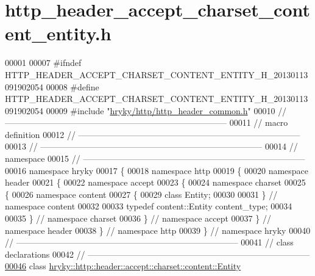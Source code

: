 \hypertarget{http__header__accept__charset__content__entity_8h_source}{\section{http\-\_\-header\-\_\-accept\-\_\-charset\-\_\-content\-\_\-entity.\-h}
}

\begin{DoxyCode}
00001 
00007 \textcolor{preprocessor}{#ifndef HTTP\_HEADER\_ACCEPT\_CHARSET\_CONTENT\_ENTITY\_H\_20130113091902054}
00008 \textcolor{preprocessor}{}\textcolor{preprocessor}{#define HTTP\_HEADER\_ACCEPT\_CHARSET\_CONTENT\_ENTITY\_H\_20130113091902054}
00009 \textcolor{preprocessor}{}\textcolor{preprocessor}{#include "\hyperlink{http__header__common_8h}{hryky/http/http_header_common.h}"}
00010 \textcolor{comment}{//
      ------------------------------------------------------------------------------}
00011 \textcolor{comment}{// macro definition}
00012 \textcolor{comment}{//
      ------------------------------------------------------------------------------}
00013 \textcolor{comment}{//
      ------------------------------------------------------------------------------}
00014 \textcolor{comment}{// namespace}
00015 \textcolor{comment}{//
      ------------------------------------------------------------------------------}
00016 \textcolor{keyword}{namespace }hryky
00017 \{
00018 \textcolor{keyword}{namespace }http
00019 \{
00020 \textcolor{keyword}{namespace }header
00021 \{
00022 \textcolor{keyword}{namespace }accept
00023 \{
00024 \textcolor{keyword}{namespace }charset
00025 \{
00026 \textcolor{keyword}{namespace }content
00027 \{
00029     \textcolor{keyword}{class }Entity;
00030 
00031 \} \textcolor{comment}{// namespace content}
00032 
00033 \textcolor{keyword}{typedef} content::Entity content\_type;
00034 
00035 \} \textcolor{comment}{// namespace charset}
00036 \} \textcolor{comment}{// namespace accept}
00037 \} \textcolor{comment}{// namespace header}
00038 \} \textcolor{comment}{// namespace http}
00039 \} \textcolor{comment}{// namespace hryky}
00040 \textcolor{comment}{//
      ------------------------------------------------------------------------------}
00041 \textcolor{comment}{// class declarations}
00042 \textcolor{comment}{//
      ------------------------------------------------------------------------------}
\hypertarget{http__header__accept__charset__content__entity_8h_source_l00046}{}\hyperlink{classhryky_1_1http_1_1header_1_1accept_1_1charset_1_1content_1_1_entity}{00046} \textcolor{comment}{}\textcolor{keyword}{class }\hyperlink{classhryky_1_1http_1_1header_1_1accept_1_1charset_1_1content_1_1_entity}{hryky::http::header::accept::charset::content::Entity}

\end{DoxyCode}
